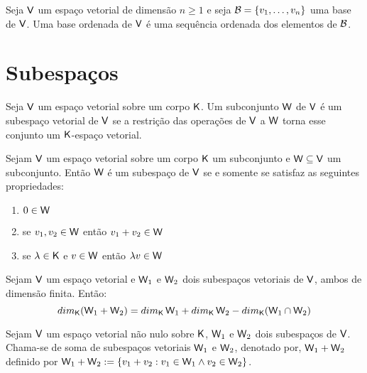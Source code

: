 \documentclass[10pt,a4paper]{book}
\begin{document}
\begin{definition}
	Seja $\mathsf{ V }$ um espaço vetorial de dimensão $n \geq 1$ e seja $\mathcal{ B } = \{ v_1, \dots, v_n \}$ uma base de $\mathsf{ V }$. Uma base ordenada de $\mathsf{ V }$ é uma sequência ordenada dos elementos de $\mathcal{ B }$.
\end{definition}




\section{Subespaços}

\begin{definition}
	Seja $\mathsf{ V }$ um espaço vetorial sobre um corpo $\mathsf{ K }$. Um subconjunto $\mathsf{ W }$ de $\mathsf{ V }$ é um subespaço vetorial de $\mathsf{ V }$ se a restrição das operações de $\mathsf{ V }$ a $\mathsf{ W }$ torna esse conjunto um $\mathsf{ K }$-espaço vetorial.
\end{definition}

\begin{proposition}
	Sejam $\mathsf{ V }$ um espaço vetorial sobre um corpo $\mathsf{ K }$ um subconjunto e $\mathsf{ W } \subseteq \mathsf{ V }$ um subconjunto. Então $\mathsf{ W }$ é um subespaço de $\mathsf{ V }$ se e somente se satisfaz as seguintes propriedades:
	\begin{enumerate}[label=(\alph*)]
		\item $0 \in \mathsf{ W }$
		\item se $v_1, v_2 \in \mathsf{ W }$ então $v_1 + v_2 \in \mathsf{ W }$
		\item se $\lambda \in \mathsf{ K }$ e $v \in \mathsf{ W }$ então $\lambda v \in \mathsf{ W }$
	\end{enumerate}
\end{proposition}

\begin{proposition}
	Sejam $\mathsf{ V }$ um espaço vetorial e $\mathsf{ W }_1$ e $\mathsf{ W }_2$ dois subespaços vetoriais de $\mathsf{ V }$, ambos de dimensão finita. Então:
	\[
		dim_{\mathsf{ K }}(\mathsf{ W }_1 + \mathsf{ W }_2) = dim_{\mathsf{ K }}\,\mathsf{ W }_1 + dim_{\mathsf{ K }}\,\mathsf{ W }_2 - dim_{\mathsf{ K }}(\mathsf{ W }_1 \cap \mathsf{ W }_2)
	\]
\end{proposition}

\begin{definition}
	Sejam $\mathsf{ V }$ um espaço vetorial não nulo sobre $\mathsf{ K }$, $\mathsf{ W }_1$ e $\mathsf{ W }_2$ dois subespaços de $\mathsf{ V }$. Chama-se de soma de subespaços vetoriais $\mathsf{ W }_1$ e $\mathsf{ W }_2$, denotado por, $\mathsf{ W }_1 + \mathsf{ W }_2$ definido por  $\mathsf{ W }_1 + \mathsf{ W }_2 := \{ v_1 + v_2 : v_1 \in \mathsf{ W }_1 \land v_2 \in \mathsf{ W }_2 \}$.
\end{definition}
\end{document}
